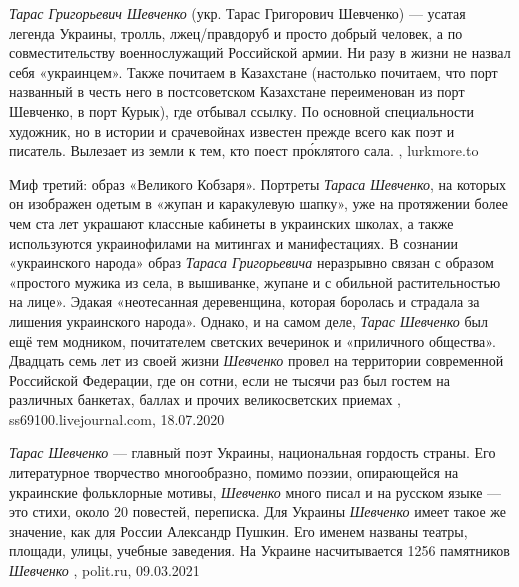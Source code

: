 \emph{Тарас Григорьевич Шевченко} (укр. Тарас Григорович Шевченко) — усатая легенда
Украины, тролль, лжец/правдоруб и просто добрый человек, а по совместительству
военнослужащий Российской армии. Ни разу в жизни не назвал себя «украинцем».
Также почитаем в Казахстане (настолько почитаем, что порт названный в честь
него в постсоветском Казахстане переименован из порт Шевченко, в порт Курык),
где отбывал ссылку. По основной специальности художник, но в истории и
срачевойнах известен прежде всего как поэт и писатель. Вылезает из земли к тем,
кто поест про́клятого сала.
, lurkmore.to

Миф третий: образ «Великого Кобзаря». Портреты \emph{Тараса Шевченко}, на которых он
изображен одетым в «жупан и каракулевую шапку», уже на протяжении более чем ста
лет украшают классные кабинеты в украинских школах, а также используются
украинофилами на митингах и манифестациях. В сознании «украинского народа»
образ \emph{Тараса Григорьевича} неразрывно связан с образом «простого мужика из села,
в вышиванке, жупане и с обильной растительностью на лице». Эдакая «неотесанная
деревенщина, которая боролась и страдала за лишения украинского народа».
Однако, и на самом деле, \emph{Тарас Шевченко} был ещё тем модником, почитателем
светских вечеринок и «приличного общества». Двадцать семь лет из своей жизни
\emph{Шевченко} провел на территории современной Российской Федерации, где он сотни,
если не тысячи раз был гостем на различных банкетах, баллах и прочих
великосветских приемах
, ss69100.livejournal.com, 18.07.2020

\emph{Тарас Шевченко} — главный поэт Украины, национальная гордость страны. Его
литературное творчество многообразно, помимо поэзии, опирающейся на украинские
фольклорные мотивы, \emph{Шевченко} много писал и на русском языке — это стихи,
около 20 повестей, переписка.  Для Украины \emph{Шевченко} имеет такое же
значение, как для России Александр Пушкин.  Его именем названы театры, площади,
улицы, учебные заведения. На Украине насчитывается 1256 памятников
\emph{Шевченко}
, polit.ru, 09.03.2021

